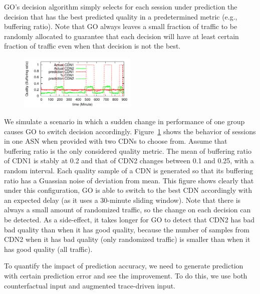  GO's decision algorithm simply selects for each session under prediction the decision that has the best predicted quality in a predetermined metric (e.g., buffering ratio). Note that GO always leaves a small fraction of traffic to be randomly allocated to guarantee that each decision will have at least certain fraction of traffic even when that decision is not the best.


\begin{figure}[h!]
\centering
 \includegraphics[width=0.5\textwidth] {figures/behavior-evaluation/simple-change.pdf}
\label{fig:behavioral}
\end{figure}

 We simulate a scenario in which a sudden change in performance of one group causes GO to switch decision accordingly. Figure~\ref{fig:behavioral} shows the behavior of sessions in one ASN when provided with two CDNs to choose from. Assume that buffering ratio is the only considered quality metric. The mean of buffering ratio of CDN1 is stably at 0.2 and that of CDN2 changes between 0.1 and 0.25, with a random interval. Each quality sample of a CDN is generated so that its buffering ratio has a Guassian noise of \fillme deviation from mean. This figure shows clearly that under this configuration, GO is able to switch to the best CDN accordingly with an expected delay (as it uses a 30-minute sliding window). Note that there is always a small amount of randomized traffic, so the change on each decision can be detected. As a side-effect, it takes longer for GO to detect that CDN2 has bad bad quality than when it has good quality, because the number of samples from CDN2 when it has bad quality (only randomized traffic) is smaller than when it has good quality (all traffic).




To quantify the impact of prediction accuracy, we need to generate prediction with certain prediction error and see the improvement. To do this, we use both counterfactual input and augmented trace-driven input. 

